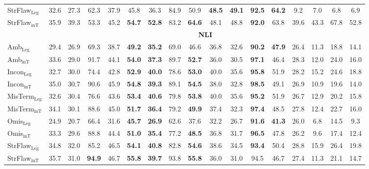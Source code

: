 \documentclass[11pt]{article}
\begin{document}
\begin{table}[h!]
\begin{tabular*}{\textwidth}{@{\extracolsep{\fill}}l|cccc|cccc|cccc|cccc@{}}
StrFlaw$ _{\text{Leg}}$    & 32.6 & 27.3 & 62.3 & 37.9 & 45.8 & 36.3 & 84.9 & 50.9 & \textbf{48.5} & \textbf{49.1} & \textbf{92.5} & \textbf{64.2} & 9.2 & 7.0 & 6.8 & 6.9 \\
StrFlaw$ _{\text{inT}}$   & 35.9 & 39.3 & 53.3 & 45.2 & \textbf{54.7} & \textbf{52.8} & 83.2 & \textbf{64.6} & 48.1 & 48.8 & \textbf{92.0} & 63.8 & 39.6 & 43.3 & 67.8 & 52.8 \\
\cmidrule{1-17}
\rowcolor{lightestgray}
\cellcolor{white} & \multicolumn{16}{c}{\textbf{NLI}} \\
Amb$ _{\text{Leg}}$      & 29.4 & 26.9 & 69.3 & 38.7 & \textbf{49.2} & \textbf{35.2} & 69.0 & 46.6 & 36.8 & 32.6 & \textbf{90.2} & \textbf{47.9} & 26.4 & 11.3 & 18.8 & 14.1 \\
Amb$ _{\text{inT}}$    & 33.6 & 29.0 & 91.7 & 44.1 & \textbf{54.0} & \textbf{37.3} & 89.7 & \textbf{52.7} & 36.0 & 30.5 & \textbf{97.1} & 46.4 & 28.3 & 12.0 & 24.0 & 16.0 \\
Incon$ _{\text{Leg}}$      & 32.7 & 30.0 & 74.4 & 42.8 & \textbf{52.9} & \textbf{40.0} & 78.6 & \textbf{53.0} & 40.0 & 35.6 & \textbf{95.8} & 51.9 & 28.2 & 15.2 & 24.6 & 18.8 \\
Incon$ _{\text{inT}}$     & 35.0 & 30.7 & 90.6 & 45.9 & \textbf{54.8} & \textbf{39.3} & 89.1 & \textbf{54.5} & 38.0 & 32.8 & \textbf{98.5} & 49.1 & 26.9 & 10.9 & 19.6 & 14.0 \\
MisTerm$ _{\text{Leg}}$    & 32.6 & 30.4 & 76.6 & 43.6 & \textbf{53.4} & \textbf{40.6} & 79.8 & \textbf{53.8} & 40.0 & 35.6 & \textbf{95.2} & 51.9 & 26.7 & 12.9 & 20.2 & 15.8 \\
MisTerm$ _{\text{inT}}$  & 34.1 & 30.1 & 88.6 & 45.0 & \textbf{51.7} & \textbf{36.4} & 79.2 & \textbf{49.9} & 37.4 & 32.3 & \textbf{97.4} & 48.5 & 27.8 & 12.4 & 22.7 & 16.0 \\
Omis$ _{\text{Leg}}$       & 24.9 & 20.7 & 66.4 & 31.6 & \textbf{45.7} & \textbf{26.9} & 62.6 & 37.6 & 32.2 & 26.7 & \textbf{91.6} & \textbf{41.3} & 26.0 & 6.8 & 14.5 & 9.3 \\
Omis$ _{\text{inT}}$      & 33.3 & 29.6 & 88.8 & 44.4 & \textbf{51.0} & \textbf{35.4} & 77.2 & \textbf{48.5} & 36.8 & 31.7 & \textbf{96.5} & 47.8 & 26.2 & 9.6 & 17.4 & 12.4 \\
StrFlaw$ _{\text{Leg}}$    & 34.8 & 32.0 & 85.2 & 46.5 & \textbf{54.1} & \textbf{40.8} & 82.8 & \textbf{54.6} & 38.6 & 34.5 & \textbf{93.4} & 50.4 & 28.8 & 15.9 & 26.4 & 19.8 \\
StrFlaw$ _{\text{inT}}$   & 35.7 & 31.0 & \textbf{94.9} & 46.7 & \textbf{55.8} & \textbf{39.7} & 93.8 & \textbf{55.8} & 36.0 & 31.0 & 94.5 & 46.7 & 27.4 & 11.3 & 21.1 & 14.7 \\

\end{tabular*}
\end{table}
\end{document}
